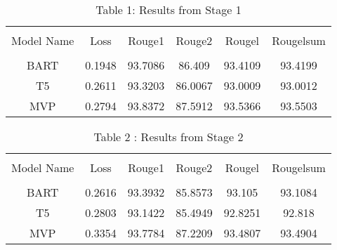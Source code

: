 \documentclass{article}
\begin{document}
\begin{center}
\begin{table}[h]
\vspace{0.4cm} 
\hspace*{3cm}\begin{tabular}{c c c c c c} 
\\
\hline \\[1ex]    
 Model Name    & Loss     & Rouge1   & Rouge2 & Rougel & Rougelsum \\ [1ex] 
 \hline \\[0.2ex]  
 BART & 0.1948 & 93.7086 & 86.409 & 93.4109 & 93.4199 \\ 
 [1ex] 

 T5 & 0.2611 & 93.3203 & 86.0067 & 93.0009 & 93.0012\\
 [1ex] 

 MVP & 0.2794 & 93.8372 & 87.5912 & 93.5366 & 93.5503\\
 [1ex] 
 \hline

\end{tabular}
\newline 
 \caption{Table 1: Results from Stage 1}
 \end{table}
\end{center}


\begin{center}
\begin{table}[h]
\vspace{0.4cm} 
\hspace*{3cm}\begin{tabular}{c c c c c c} 
\\
\hline \\[1ex]  
 Model Name    & Loss     & Rouge1   & Rouge2 & Rougel & Rougelsum \\ [1ex] 
 \hline \\[0.2ex]
 BART & 0.2616 & 93.3932 & 85.8573 & 93.105 & 93.1084 \\ 
 [1ex] 

 T5 & 0.2803 & 93.1422 & 85.4949 & 92.8251 & 92.818\\
 [1ex] 

 MVP & 0.3354 & 93.7784 & 87.2209 & 93.4807 & 93.4904\\
 [1ex] 
 \hline
\end{tabular}
\caption{Table 2 : Results from Stage 2}
 \end{table}
\end{center}
\end{document}
